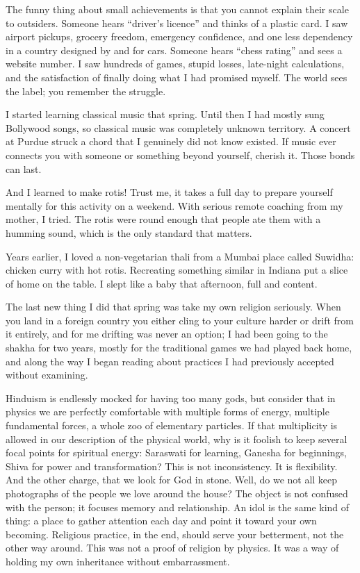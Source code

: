 \documentclass[11pt,twoside,openany]{book}
\newcommand{\scene}{\par\vspace{0.7em}{\centering\color{accent}\rule{0.85cm}{0.6pt}\par}\vspace{0.5em}\noindent\ignorespaces}
\begin{document}
The funny thing about small achievements is that you cannot explain their
scale to outsiders. Someone hears ``driver's licence'' and thinks of a
plastic card. I saw airport pickups, grocery freedom, emergency confidence,
and one less dependency in a country designed by and for cars. Someone hears
``chess rating'' and sees a website number. I saw hundreds of games, stupid
losses, late-night calculations, and the satisfaction of finally doing what I
had promised myself. The world sees the label; you remember the struggle.

\scene

I started learning classical music that spring. Until then I had mostly sung
Bollywood songs, so classical music was completely unknown territory. A
concert at Purdue struck a chord that I genuinely did not know existed. If
music ever connects you with someone or something beyond yourself, cherish
it. Those bonds can last.

And I learned to make rotis! Trust me, it takes a full day to prepare yourself
mentally for this activity on a weekend. With serious remote coaching from my
mother, I tried. The rotis were round enough that people ate them with a
humming sound, which is the only standard that matters.

Years earlier, I loved a non-vegetarian thali from a Mumbai place called
Suwidha: chicken curry with hot rotis. Recreating something similar in
Indiana put a slice of home on the table. I slept like a baby that afternoon,
full and content.

\scene

The last new thing I did that spring was take my own religion seriously. When
you land in a foreign country you either cling to your culture harder or drift
from it entirely, and for me drifting was never an option; I had been going to
the shakha for two years, mostly for the traditional games we had played back
home, and along the way I began reading about practices I had previously
accepted without examining.

Hinduism is endlessly mocked for having too many gods, but consider that in
physics we are perfectly comfortable with multiple forms of energy, multiple
fundamental forces, a whole zoo of elementary particles. If that multiplicity
is allowed in our description of the physical world, why is it foolish to keep
several focal points for spiritual energy: Saraswati for learning, Ganesha for
beginnings, Shiva for power and transformation? This is not inconsistency. It
is flexibility. And the other charge, that we look for God in stone. Well, do
we not all keep photographs of the people we love around the house? The object
is not confused with the person; it focuses memory and relationship. An idol
is the same kind of thing: a place to gather attention each day and point it
toward your own becoming. Religious practice, in the end, should serve your
betterment, not the other way around. This was not a proof of religion by
physics. It was a way of holding my own inheritance without embarrassment.
\end{document}
